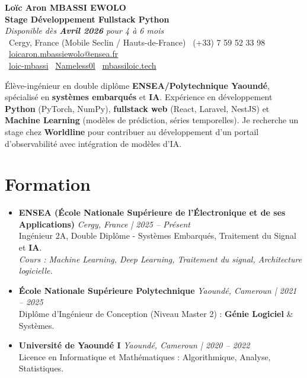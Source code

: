 \documentclass[a4paper,11pt]{article}
\begin{document}
\begin{center}
    {\Large \textbf{Loïc Aron MBASSI EWOLO}} \\ \vspace{4pt}
    \textbf{\large Stage Développement Fullstack Python} \\
    \textit{\small Disponible dès \textbf{Avril 2026} pour 4 à 6 mois}\\
    \vspace{4pt}
    \small
    \faMapMarker\ Cergy, France (Mobile Seclin / Hauts-de-France) \quad
    \faPhone\ (+33) 7 59 52 33 98 \quad
    \faEnvelope\ \href{mailto:loicaron.mbassiewolo@ensea.fr}{loicaron.mbassiewolo@ensea.fr} \\ \vspace{2pt}
    \faLinkedin\ \href{https://www.linkedin.com/in/loic-mbassi}{loic-mbassi} \quad
    \faGithub\ \href{https://github.com/Nameless0l}{Nameless0l} \quad
    \faGlobe\ \href{https://mbassiloic.tech}{mbassiloic.tech}
\end{center}

\vspace{-6pt}

\noindent\small{Élève-ingénieur en double diplôme \textbf{ENSEA/Polytechnique Yaoundé}, spécialisé en \textbf{systèmes embarqués} et \textbf{IA}. Expérience en développement \textbf{Python} (PyTorch, NumPy), \textbf{fullstack web} (React, Laravel, NestJS) et \textbf{Machine Learning} (modèles de prédiction, séries temporelles). Je recherche un stage chez \textbf{Worldline} pour contribuer au développement d'un portail d'observabilité avec intégration de modèles d'IA.}

\section{Formation}
\begin{itemize}[leftmargin=*, label={.}, nosep]
    \item \textbf{ENSEA (École Nationale Supérieure de l'Électronique et de ses Applications)} \hfill \textit{Cergy, France | 2025 -- Présent} \\
    \small{Ingénieur 2A, Double Diplôme - Systèmes Embarqués, Traitement du Signal et \textbf{IA}.} \\
    \textit{\small{Cours : Machine Learning, Deep Learning, Traitement du signal, Architecture logicielle.}}
    \vspace{2pt}
    \item \textbf{École Nationale Supérieure Polytechnique} \hfill \textit{Yaoundé, Cameroun | 2021 -- 2025} \\
    \small{Diplôme d'Ingénieur de Conception (Niveau Master 2) : \textbf{Génie Logiciel} \& Systèmes.}
    \item \textbf{Université de Yaoundé I} \hfill \textit{Yaoundé, Cameroun | 2020 -- 2022} \\
    \small{Licence en Informatique et Mathématiques : Algorithmique, Analyse, Statistiques.}
\end{itemize}
\end{document}
